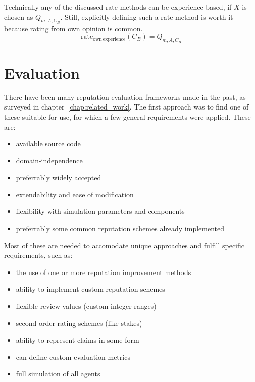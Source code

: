 \documentclass[%
    ]{\PathToTumTemplate/thesis/tum_thesis}
\begin{document}
Technically any of the discussed rate methods can be experience-based, if $X$ is chosen as $Q_{m,A,C_{B}}$.
Still, explicitly defining such a rate method is worth it because rating from own opinion is common.
\begin{equation}\label{eq:rate_own_experience}
\mathrm{rate_{own~experience}}(C_B) = Q_{m,A,C_{B}}
\end{equation}



\section{Evaluation}\label{sec:approach_evaluation_framework}


There have been many reputation evaluation frameworks made in the past, as surveyed in chapter~\ref{chap:related_work}.
The first approach was to find one of these suitable for use, for which a few general requirements were applied.
These are:
\begin{itemize}
    \item available source code
    \item domain-independence
    \item preferrably widely accepted
    \item extendability and ease of modification
    \item flexibility with simulation parameters and components
    \item preferrably some common reputation schemes already implemented
\end{itemize}

Most of these are needed to accomodate unique approaches and fulfill specific requirements, such as:
\begin{itemize}
    \item the use of one or more reputation improvement methods
	\item ability to implement custom reputation schemes
    \item flexible review values (custom integer ranges)
    \item second-order rating schemes (like stakes)
    \item ability to represent \glspl{claim} in some form
    \item can define custom evaluation metrics
    \item full simulation of all agents
\end{itemize}
\end{document}
